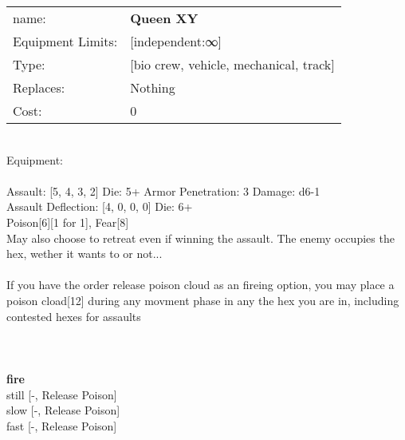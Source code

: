 \noindent
\begin{tabular}{ll}
name: &{\bf Queen XY } \\
Equipment Limits: &[independent:∞] \\
Type: &[bio crew, vehicle, mechanical, track] \\
Replaces: &Nothing \\
Cost: & 0\\
\end{tabular}
\ \\
Equipment:  \\
\ \\
Assault: [5, 4, 3, 2] Die: 5+ Armor Penetration: 3 Damage: d6-1 \\
Assault Deflection: [4, 0, 0, 0] Die: 6+\\
\indent Poison[6][1 for 1], Fear[8]\\ 
May also choose to retreat even if winning the assault. The enemy occupies the hex, wether it wants to or not...\\ 
 
\ \\
If you have the order release poison cloud as an fireing option, you may place a poison cload[12] during any movment phase in any the hex you are in, including contested hexes for assaults\\ 

\ \\
 
\ \\



\ \\ {\bf fire } \\
still [-, Release Poison] \\
slow [-, Release Poison] \\
fast [-, Release Poison] \\


